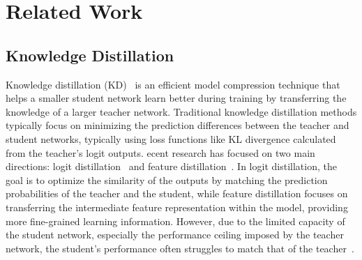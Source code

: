 \documentclass{article} %
\begin{document}
\section{Related Work}
\label{sec:related_work}

\subsection{Knowledge Distillation}
\label{sec:kd}
Knowledge distillation (KD)~\citep{hinton2015distilling} is an efficient model compression technique that helps a smaller student network learn better during training by transferring the knowledge of a larger teacher network. Traditional knowledge distillation methods typically focus on minimizing the prediction differences between the teacher and student networks, typically using loss functions like KL divergence calculated from the teacher's logit outputs. ecent research has focused on two main directions: logit distillation~\citep{hinton2015distilling, chen2020online, li2020online, li2022curriculum, zhao2022decoupled, jin2023multi, zhang2023blindly, sun2024logit} and feature distillation~\citep{yim2017gift, peng2019correlation, heo2019comprehensive, chen2021distilling, li2021online, chen2022knowledge, lin2022knowledge, guo2023class}. In logit distillation, the goal is to optimize the similarity of the outputs by matching the prediction probabilities of the teacher and the student, while feature distillation focuses on transferring the intermediate feature representation within the model, providing more fine-grained learning information. However, due to the limited capacity of the student network, especially the performance ceiling imposed by the teacher network, the student's performance often struggles to match that of the teacher~\citep{gou2021knowledge, hu2023teacher, xu2024survey}.
\end{document}
